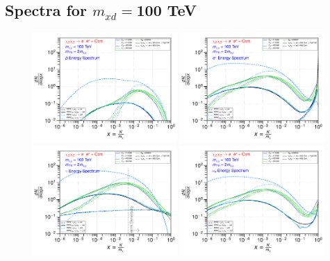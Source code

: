 \documentclass[epj,nopacs,fleqn]{svjour}
\begin{document}
\subsection{Spectra for $m_{xd}=$100 TeV}
\begin{figure}[!b]
	\centering
	\subfigure
	{ \includegraphics[width=0.49\textwidth]{Fig/xdxd_ee_eeZ_eveW/100_antiprotons_ee_eeZ_eveW_100.pdf}}
	\subfigure
	{ \includegraphics[width=0.49\textwidth]{Fig/xdxd_ee_eeZ_eveW/100_positrons_ee_eeZ_eveW_100.pdf}}
	\subfigure
	{ \includegraphics[width=0.49\textwidth]{Fig/xdxd_ee_eeZ_eveW/100_gammas_ee_eeZ_eveW_100.pdf}}
	\subfigure
	{ \includegraphics[width=0.49\textwidth]{Fig/xdxd_ee_eeZ_eveW/100_neutrinos_e_ee_eeZ_eveW_100.pdf}}

\end{figure}
\end{document}
